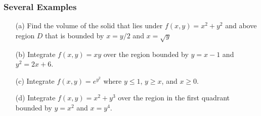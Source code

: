 \documentclass{beamer}
\begin{document}
\begin{frame}
\frametitle{\textbf{Several Examples}}

\begin{itemize}
	\item[(a)] Find the volume of the solid that lies under $f(x,y) = x^2+y^2$ and above region $D$ that is bounded by $x=y/2$ and $x=\sqrt{y}$
	\item[(b)] Integrate $f(x,y)=xy$ over the region bounded by $y=x-1$ and $y^2=2x+6$.
	\item[(c)] Integrate $f(x,y) = e^{y^2}$ where $y\leq1$, $y\geq x$, and $x\geq0$.
	\item[(d)] Integrate $f(x,y)=x^2+y^3$ over the region in the first quadrant bounded by $y=x^2$ and $x=y^4$.
\end{itemize}
\end{frame}
\end{document}
